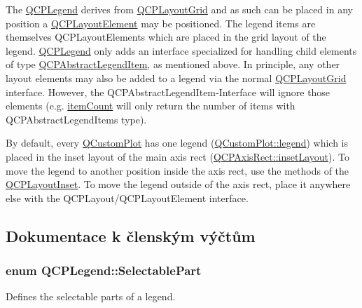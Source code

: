 The \hyperlink{classQCPLegend}{Q\+C\+P\+Legend} derives from \hyperlink{classQCPLayoutGrid}{Q\+C\+P\+Layout\+Grid} and as such can be placed in any position a \hyperlink{classQCPLayoutElement}{Q\+C\+P\+Layout\+Element} may be positioned. The legend items are themselves Q\+C\+P\+Layout\+Elements which are placed in the grid layout of the legend. \hyperlink{classQCPLegend}{Q\+C\+P\+Legend} only adds an interface specialized for handling child elements of type \hyperlink{classQCPAbstractLegendItem}{Q\+C\+P\+Abstract\+Legend\+Item}, as mentioned above. In principle, any other layout elements may also be added to a legend via the normal \hyperlink{classQCPLayoutGrid}{Q\+C\+P\+Layout\+Grid} interface. However, the Q\+C\+P\+Abstract\+Legend\+Item-\/\+Interface will ignore those elements (e.\+g. \hyperlink{classQCPLegend_a198228e9cdc78d3a3c306fa6763d0404}{item\+Count} will only return the number of items with Q\+C\+P\+Abstract\+Legend\+Items type).

By default, every \hyperlink{classQCustomPlot}{Q\+Custom\+Plot} has one legend (\hyperlink{classQCustomPlot_a4eadcd237dc6a09938b68b16877fa6af}{Q\+Custom\+Plot\+::legend}) which is placed in the inset layout of the main axis rect (\hyperlink{classQCPAxisRect_a4114887c7141b59650b7488f930993e5}{Q\+C\+P\+Axis\+Rect\+::inset\+Layout}). To move the legend to another position inside the axis rect, use the methods of the \hyperlink{classQCPLayoutInset}{Q\+C\+P\+Layout\+Inset}. To move the legend outside of the axis rect, place it anywhere else with the Q\+C\+P\+Layout/\+Q\+C\+P\+Layout\+Element interface. 

\subsection{Dokumentace k členským výčtům}
\hypertarget{classQCPLegend_a5404de8bc1e4a994ca4ae69e2c7072f1}{}
\subsubsection[{Selectable\+Part}]{\setlength{\rightskip}{0pt plus 5cm}enum {\bf Q\+C\+P\+Legend\+::\+Selectable\+Part}}\label{classQCPLegend_a5404de8bc1e4a994ca4ae69e2c7072f1}


Defines the selectable parts of a legend. 

